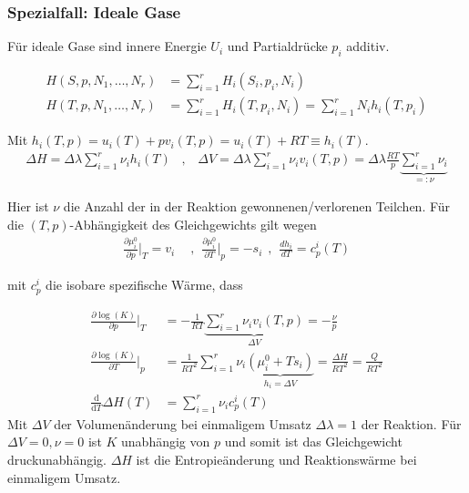 \vspace{-5pt}

\subsubsection{Spezialfall: Ideale Gase}

Für ideale Gase sind innere Energie $U_i$ und Partialdrücke $p_i$ additiv.

\vspace{-10pt}

\begin{align*}
    H(S,p,N_1,\dots,N_r) &= \sum_{i=1}^r H_i (S_i , p_i , N_i)
    \\
    H(T,p,N_1,\dots,N_r) &= \sum_{i=1}^r H_i(T,p_i,N_i) = \sum_{i=1}^r N_i h_i (T,p_i)
\end{align*}

\vspace{-2pt}

Mit $h_i(T,p) = u_i(T) + p v_i(T,p) = u_i (T) + R T \equiv h_i(T)$.
\begin{align*}
    \Delta H = \Delta \lambda \sum_{i=1}^r \nu_i h_i (T)
    \hspace{10pt} , \hspace{10pt}
    \Delta V = \Delta \lambda \sum_{i=1}^r \nu_i v_i (T,p)
        = \Delta \lambda \frac{R T}{p} \underbrace{\sum_{i=1}^r \nu_i}_{=: \nu}
\end{align*}

\vspace{-7pt}

Hier ist $\nu$ die Anzahl der in der Reaktion gewonnenen/verlorenen Teilchen.
Für die $(T,p)$-Abhängigkeit des Gleichgewichts gilt wegen
\begin{align*}
    \frac{\partial \mu_i^0}{\partial p} \Big|_T = v_i
    \hspace{5pt} &, \hspace{5pt}
    \frac{\partial \mu_i^0}{\partial T} \Big|_p = - s_i
    \hspace{5pt} , \hspace{5pt}
    \frac{d h_i}{d T} = c_p^i (T)
\end{align*}

mit $c_p^i$ die isobare spezifische Wärme, dass

\begin{align*}
    \frac{\partial \log(K)}{\partial p} \Big|_T
    &= - \frac{1}{R T} \underbrace{\sum_{i=1}^r \nu_i v_i (T,p)}_{\Delta V}
    = - \frac{\nu}{p}
    \\
    \frac{\partial \log(K)}{\partial T} \Big|_p
    &= \frac{1}{R T^2} \sum_{i=1}^r \nu_i \underbrace{(\mu_i^0 + T s_i)}_{h_i = \Delta V}
    = \frac{\Delta H}{R T^2} = \frac{Q}{R T^2}
    \\
    \frac{\mathrm{d}}{\mathrm{d} T} \Delta H(T)
    &= \sum_{i=1}^r \nu_i c_p^i (T)
\end{align*}
Mit $\Delta V$ der Volumenänderung bei einmaligem Umsatz $\Delta \lambda = 1$ der
Reaktion. Für $\Delta V = 0,\nu=0$ ist $K$ unabhängig von $p$ und somit ist das
Gleichgewicht druckunabhängig. $\Delta H$ ist die Entropieänderung und Reaktionswärme
bei einmaligem Umsatz.

